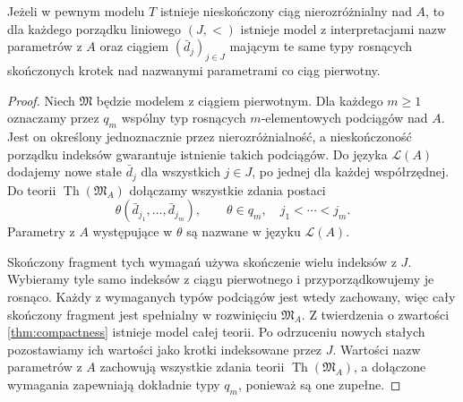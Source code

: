 \begin{lemat}
\label{lem:mod-indiscernible-stretch}
Jeżeli w pewnym modelu $T$ istnieje nieskończony
ciąg nierozróżnialny nad $A$, to dla każdego
porządku liniowego $(J,<)$ istnieje model
z interpretacjami nazw parametrów z $A$
oraz ciągiem $(\bar d_j)_{j\in J}$ mającym
te same typy rosnących skończonych krotek
nad nazwanymi parametrami co ciąg pierwotny.
\end{lemat}
\begin{proof}
Niech $\mathfrak M$ będzie modelem z ciągiem
pierwotnym. Dla każdego $m\geq1$ oznaczamy
przez $q_m$ wspólny typ rosnących $m$-elementowych
podciągów nad $A$.
Jest on określony jednoznacznie przez
nierozróżnialność, a nieskończoność porządku
indeksów gwarantuje istnienie takich podciągów.
Do języka $\mathcal L(A)$ dodajemy nowe
stałe $\bar d_j$ dla wszystkich $j\in J$,
po jednej dla każdej współrzędnej.
Do teorii $\operatorname{Th}(\mathfrak M_A)$
dołączamy wszystkie zdania postaci
\[
\theta(\bar d_{j_1},\ldots,\bar d_{j_m}),
\qquad
\theta\in q_m,\quad j_1<\cdots<j_m.
\]
Parametry z $A$ występujące w $\theta$
są nazwane w języku $\mathcal L(A)$.

Skończony fragment tych wymagań używa
skończenie wielu indeksów z $J$.
Wybieramy tyle samo indeksów z ciągu
pierwotnego i przyporządkowujemy je rosnąco.
Każdy z wymaganych typów podciągów jest
wtedy zachowany, więc cały skończony fragment
jest spełnialny w rozwinięciu $\mathfrak M_A$.
Z twierdzenia o zwartości \ref{thm:compactness}
istnieje model całej teorii.
Po odrzuceniu nowych stałych pozostawiamy
ich wartości jako krotki indeksowane przez $J$.
Wartości nazw parametrów z $A$ zachowują
wszystkie zdania teorii $\operatorname{Th}(\mathfrak M_A)$,
a dołączone wymagania zapewniają dokładnie
typy $q_m$, ponieważ są one zupełne.
\end{proof}

